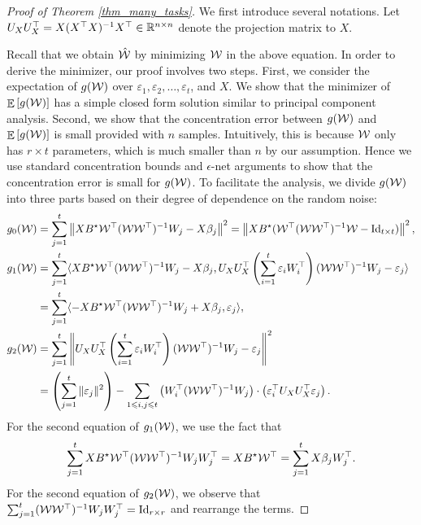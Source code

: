 \begin{proof}[Proof of Theorem \ref{thm_many_tasks}]
	We first introduce several notations.
	Let $U_X U_X^{\top} = X (X^{\top} X)^{-1} X^{\top} \in\mathbb{R}^{n \times n}$ denote the projection matrix to $X$.


	Recall that we obtain $\hat{{\mathcal W}}$ by minimizing ${\mathcal W}$ in the above equation.
	In order to derive the minimizer, our proof involves two steps.
	First, we consider the expectation of $g({\mathcal W})$ over $\varepsilon_1, \varepsilon_2, \dots, \varepsilon_t$, and $X$.
	We show that the minimizer of $\mathop{\mathbb{E}}\left[ g({\mathcal W}) \right]$ has a simple closed form solution similar to principal component analysis.
	Second, we show that the concentration error between $g({\mathcal W})$ and $\mathop{\mathbb{E}}\left[ g({\mathcal W}) \right]$ is small provided with $n$ samples.
	Intuitively, this is because ${\mathcal W}$ only has $r \times t$ parameters, which is much smaller than $n$ by our assumption.
	Hence we use standard concentration bounds and $\epsilon$-net arguments to show that the concentration error is small for $g({\mathcal W})$.
	To facilitate the analysis, we divide $g({\mathcal W})$ into three parts based on their degree of dependence on the random noise:
	\begin{align*}
		g_0({\mathcal W}) &= \sum_{j=1}^t \left\| XB^{\star} {\mathcal W}^{\top} ({\mathcal W}{\mathcal W}^{\top})^{-1} W_j - X\beta_j \right\|^2 = \left\| X B^{\star} ({\mathcal W}^{\top} ({\mathcal W}{\mathcal W}^{\top})^{-1} {\mathcal W} - \operatorname{Id}_{t\times t}) \right\|^2, \\
		g_1({\mathcal W}) &= \sum_{j=1}^t \langle XB^{\star} {\mathcal W}^{\top} ({\mathcal W}{\mathcal W}^{\top})^{-1}W_j - X\beta_j, U_X U_X^{\top} \left({\sum_{i=1}^t \varepsilon_i W_i^{\top}}\right) ({\mathcal W}{\mathcal W}^{\top})^{-1} W_j - \varepsilon_j \rangle \\
		&= \sum_{j=1}^t \langle -X B^{\star} {\mathcal W}^{\top} ({\mathcal W} {\mathcal W}^{\top})^{-1} W_j + X\beta_j, \varepsilon_j \rangle, \\
		g_2({\mathcal W}) &= \sum_{j=1}^t \left\| U_X U_X^{\top} \left({\sum_{i=1}^t \varepsilon_i W_i^{\top}}\right) ({\mathcal W}{\mathcal W}^{\top})^{-1}W_j - \varepsilon_j \right\|^2 \\
		&= \left({\sum_{j=1}^t \|\varepsilon_j\|^2}\right) - \sum_{1\leqslant i,j\leqslant t} \left({W_i^{\top} ({\mathcal W} {\mathcal W}^{\top})^{-1} W_j}\right) \cdot \left({\varepsilon_i^{\top} U_X U_X^{\top} \varepsilon_j}\right).
	\end{align*}
	For the second equation of $g_1({\mathcal W})$, we use the fact that
		\[ \sum_{j=1}^t X B^{\star} {\mathcal W}^{\top} ({\mathcal W}{\mathcal W}^{\top})^{-1} W_j W_j^{\top} = X B^{\star} {\mathcal W}^{\top} = \sum_{j=1}^t X \beta_j W_j^{\top}. \]
	For the second equation of $g_2({\mathcal W})$, we observe that $\sum_{j=1}^t ({\mathcal W}{\mathcal W}^{\top})^{-1} W_j W_j^{\top} = \operatorname{Id}_{r\times r}$ and rearrange the terms.


\end{proof}
